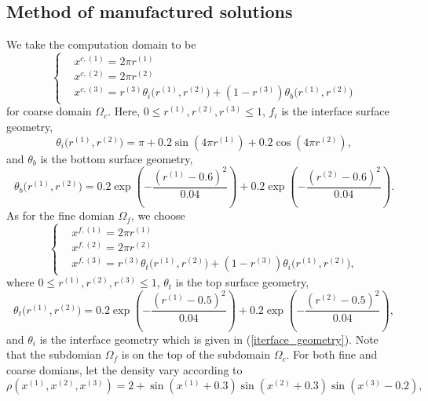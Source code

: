 \documentclass[a4paper]{article}
\begin{document}
\subsection{Method of manufactured solutions}\label{manufactured_sol}
We take the computation domain to be 
\begin{equation}\label{coarse_domain_manufactured}
 \left\{
\begin{aligned}
& x^{c,(1)} = 2\pi r^{(1)}\\
& x^{c,(2)} = 2\pi r^{(2)}\\
& x^{c,(3)} = r^{(3)}\theta_i\big(r^{(1)},r^{(2)}\big) + (1-r^{(3)})\theta_b\big(r^{(1)},r^{(2)}\big)
\end{aligned}
\right.
\end{equation}
for coarse domain $\Omega_c$. Here, $0\leq r^{(1)}, r^{(2)}, r^{(3)}\leq 1$, $f_i$ is the interface surface geometry,
\begin{equation}\label{iterface_geometry}
\theta_i\big(r^{(1)},r^{(2)}\big) = \pi+0.2\sin(4\pi r^{(1)})+0.2\cos(4\pi r^{(2)}),
\end{equation}
and 
$\theta_b$ is the bottom surface geometry,
\begin{equation}\label{bottom_geometry}
\theta_b\big(r^{(1)},r^{(2)}\big) = 0.2\exp\left(-\frac{(r^{(1)}-0.6)^2}{0.04}\right)+0.2\exp\left(-\frac{(r^{(2)}-0.6)^2}{0.04}\right).
\end{equation}
As for the fine domian $\Omega_f$, we choose 
\begin{equation}\label{fine_domain_manufactured}
\left\{
\begin{aligned}
& x^{f,(1)} = 2\pi r^{(1)}\\
& x^{f,(2)} = 2\pi r^{(2)}\\
& x^{f,(3)} = r^{(3)}\theta_t\big(r^{(1)},r^{(2)}\big) + (1-r^{(3)})\theta_i\big(r^{(1)},r^{(2)}\big),
\end{aligned}
\right.
\end{equation}
where $0\leq r^{(1)}, r^{(2)}, r^{(3)}\leq 1$, $\theta_t$ is the top surface geometry,
\begin{equation}\label{top_geometry}
\theta_t\big(r^{(1)},r^{(2)}\big) = 0.2\exp\left(-\frac{(r^{(1)}-0.5)^2}{0.04}\right)+0.2\exp\left(-\frac{(r^{(2)}-0.5)^2}{0.04}\right),
\end{equation}
and $\theta_i$ is the interface geometry which is given in (\ref{iterface_geometry}). Note that the subdomian 
$\Omega_f$ is on the top of the subdomain $\Omega_c$. For both fine and coarse domians, let the density vary according to
\begin{equation}\label{density_function}
\rho(x^{(1)},x^{(2)},x^{(3)}) = 2 + \sin(x^{(1)}+0.3)\sin(x^{(2)}+0.3)\sin(x^{(3)}-0.2),
\end{equation}
\end{document}
